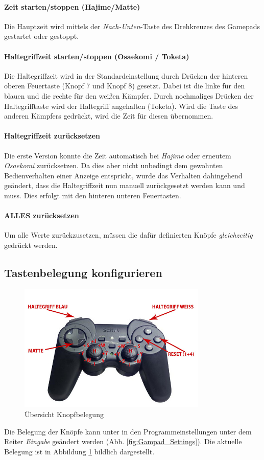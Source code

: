 ﻿\documentclass[11pt,numbers=noenddot]{scrreprt}
\begin{document}
\paragraph{Zeit starten/stoppen (Hajime/Matte)}
Die Hauptzeit wird mittels der \emph{Nach-Unten}-Taste des Drehkreuzes des Gamepads gestartet oder gestoppt.

\paragraph{Haltegriffzeit starten/stoppen (Osaekomi / Toketa)}
Die Haltegriffzeit wird in der Standardeinstellung durch Drücken der hinteren oberen Feuertaste (Knopf 7 und Knopf 8) gesetzt. Dabei ist die linke für den blauen und die rechte für den weißen Kämpfer. Durch nochmaliges Drücken der Haltegrifftaste wird der Haltegriff angehalten (Toketa). Wird die Taste des anderen Kämpfers gedrückt, wird die Zeit für diesen übernommen.

\paragraph{Haltegriffzeit zurücksetzen}
Die erste Version konnte die Zeit automatisch bei \emph{Hajime} oder erneutem \emph{Osaekomi} zurücksetzen. Da dies aber nicht unbedingt dem gewohnten Bedienverhalten einer Anzeige entspricht, wurde das Verhalten dahingehend geändert, dass die Haltegriffzeit nun manuell zurückgesetzt werden kann und muss. Dies erfolgt mit den hinteren unteren Feuertasten.

\paragraph{ALLES zurücksetzen}
Um alle Werte zurückzusetzen, müssen die dafür definierten Knöpfe \emph{gleichzeitig} gedrückt werden.

\subsection{Tastenbelegung konfigurieren}
\begin{figure}
	\centering
		\includegraphics[width=0.8\textwidth]{images/p380.jpg}
	\caption{Übersicht Knopfbelegung}
	\label{fig:Belegung}
\end{figure}
Die Belegung der Knöpfe kann unter in den Programmeinstellungen unter dem Reiter \emph{Eingabe} geändert werden (Abb. \ref{fig:Gampad_Settings}). 
Die aktuelle Belegung ist in Abbildung \ref{fig:Belegung} bildlich dargestellt.
\end{document}
